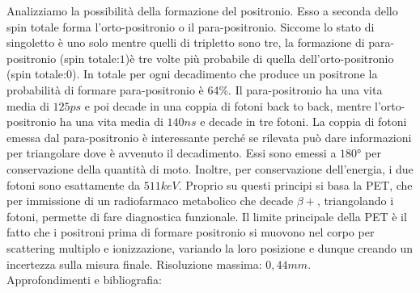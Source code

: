 Analizziamo la possibilità della formazione del positronio. Esso a seconda dello spin totale forma l'orto-positronio o il para-positronio. Siccome lo stato di singoletto è uno solo mentre quelli di tripletto sono tre, la formazione di para-positronio (spin totale:$1$)è tre volte più probabile di quella dell'orto-positronio (spin totale:$0$). 
In totale per ogni decadimento che produce un positrone la probabilità di formare para-positronio è 64\%. 
Il para-positronio ha una vita media di $125 ps$ e poi decade in una coppia di fotoni back to back, mentre l'orto-positronio ha una vita media di $140 ns$ e decade in tre fotoni. La coppia di fotoni emessa dal para-positronio è interessante perché se rilevata può dare informazioni per triangolare dove è avvenuto il decadimento. Essi sono emessi a $\ang{180}$ per conservazione della quantità di moto. Inoltre, per conservazione dell'energia, i due fotoni sono esattamente da $511 keV$.
Proprio su questi principi si basa la PET, che per immissione di un radiofarmaco metabolico che decade $\beta+$, triangolando i fotoni, permette di fare diagnostica funzionale.
Il limite principale della PET è il fatto che i positroni prima di formare positronio si muovono nel corpo per scattering multiplo e ionizzazione, variando la loro posizione e dunque creando un incertezza sulla misura finale.
Risoluzione massima: $0,44 mm$.\\

Approfondimenti e bibliografia: \cite{PET1} \cite{PET2}

